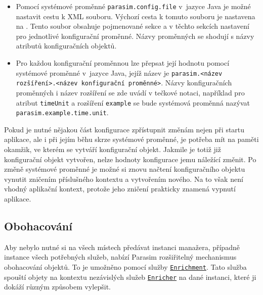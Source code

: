 \begin{itemize}
	\item	Pomocí systémové proměnné \texttt{parasim.config.file} v~jazyce Java je mož\-né nastavit cestu k XML souboru.
			Výchozí cesta k tomuto souboru je nastavena na . Tento soubor
			obsahuje pojmenované sekce a v těchto sekcích nastavení pro jednotlivé konfigurační
			pro\-měn\-né. Názvy proměnných se shodují s názvy atributů kon\-fi\-gu\-rač\-ních objektů.

	\item	Pro každou konfigurační proměnnou lze přepsat její hodnotu po\-mo\-cí systémové
			proměnné v~jazyce Java, jejíž název je \texttt{parasim.<název roz\-ší\-ření>.<název konfigurační proměnné>}.
			Názvy kon\-fi\-gu\-rač\-ních proměnných i název rozšíření se zde uvádí v tečkové notaci, například pro atribut \texttt{timeUnit}
			a rozšíření \texttt{example} se bude sys\-té\-mo\-vá proměnná nazývat \texttt{parasim.example.time.unit}.
\end{itemize}

Pokud je nutné nějakou část konfigurace zpřístupnit
změnám nejen při startu aplikace, ale i při jejím běhu skrze systémové proměnné, je potřeba mít na paměti
okamžik, ve kterém se vytváří konfigurační objekt. Jakmile je totiž již konfigurační objekt vytvořen,
nelze hodnoty konfigurace jemu náležící změnit. Po změně systémové proměnné
je možné si znovu načtení konfiguračního objektu vynutit zničením příslušného kontextu
a vy\-tvo\-ře\-ním nového. Na to však není vhodný aplikační kontext, protože jeho
zničení prakticky znamená vypnutí aplikace.

\subsection{Obohacování}\label{section:enrichment}

Aby nebylo nutné si na všech místech předávat instanci manažera, případně instance všech
potřebných služeb, nabízí Parasim rozšiřitelný mechanismus obohacování objektů.
To je umožněno pomocí služby \href{https://github.com/sybila/parasim/blob/2.0.0.Final/core/src/main/java/org/sybila/parasim/core/api/enrichment/Enrichment.java}{\texttt{Enrichment}}.
Tato služba spouští objety na kontextu nezávislých služeb \href{https://github.com/sybila/parasim/blob/2.0.0.Final/core/src/main/java/org/sybila/parasim/core/spi/enrichment/Enricher.java}{\texttt{Enricher}}
na dané instanci, které ji dokáží různým způsobem vylepšit. 

